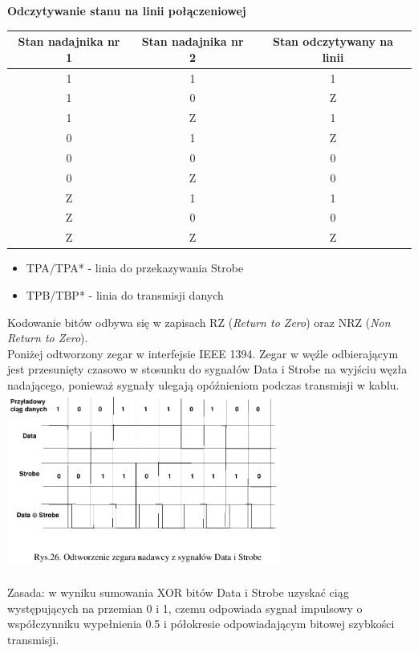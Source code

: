\textbf{Odczytywanie stanu na linii połączeniowej} \\
\begin{tabular}{|c|c|c|}
	\hline Stan nadajnika nr 1 & Stan nadajnika nr 2 & Stan odczytywany na linii \\ 
	\hline 1 & 1 & 1 \\ 
	\hline 1 & 0 & Z \\ 
	\hline 1 & Z & 1 \\ 
	\hline 0 & 1 & Z \\ 
	\hline 0 & 0 & 0 \\ 
	\hline 0 & Z & 0 \\ 
	\hline Z & 1 & 1 \\ 
	\hline Z & 0 & 0 \\ 
	\hline Z & Z & Z \\ 
	\hline 
\end{tabular} 
\begin{itemize}
	\item TPA/TPA* - linia do przekazywania Strobe
	\item TPB/TBP* - linia do transmisji danych
\end{itemize}
Kodowanie bitów odbywa się w zapisach RZ (\emph{Return to Zero}) oraz NRZ (\emph{Non Return to Zero}).\\
Poniżej odtworzony zegar w interfejsie IEEE 1394. Zegar w węźle odbierającym jest przesunięty czasowo w stosunku do sygnałów Data i Strobe na wyjściu węzła nadającego, ponieważ sygnały ulegają opóźnieniom podczas transmisji w kablu.\\
\includegraphics[width=9cm]{./wyklady/FIREWIRE_28_1.pdf}\\\\
Zasada: w wyniku sumowania XOR bitów Data i Strobe uzyskać ciąg występujących na przemian 0 i 1, czemu odpowiada sygnał impulsowy o współczynniku wypełnienia 0.5 i półokresie odpowiadającym bitowej szybkości transmisji.\\\\
